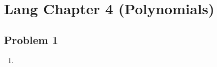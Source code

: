 \documentclass[Lang.tex]{subfiles}
\begin{document}
\section*{Lang Chapter 4 (Polynomials)}

\subsection{Problem 1}

	\begin{enumerate}
		\item 
	\end{enumerate}
\end{document}
